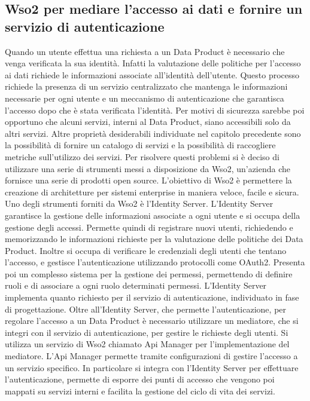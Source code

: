 \documentclass[12pt]{report}
\begin{document}
\subsection{Wso2 per mediare l'accesso ai dati e fornire un servizio di autenticazione}
Quando un utente effettua una richiesta a un  Data Product è necessario che venga verificata la sua identità.
Infatti la valutazione delle politiche per l'accesso ai dati richiede le informazioni associate all'identità dell'utente.
Questo processo richiede la presenza di un servizio centralizzato che mantenga le informazioni necessarie per ogni utente e un meccanismo di autenticazione che garantisca l'accesso dopo che è stata verificata l'identità.
Per motivi di sicurezza sarebbe poi opportuno che alcuni servizi, interni al Data Product, siano accessibili solo da altri servizi.
Altre proprietà desiderabili individuate nel capitolo precedente sono la possibilità di fornire un catalogo di servizi e la possibilità di raccogliere metriche sull'utilizzo dei servizi.
Per risolvere questi problemi si è deciso di utilizzare una serie di strumenti messi a disposizione da Wso2, un'azienda che fornisce una serie di prodotti open source. 
L'obiettivo di Wso2 è permettere la creazione di architetture per sistemi enterprise in maniera veloce, facile e sicura.
Uno degli strumenti forniti da Wso2 è l'Identity Server.
L'Identity Server garantisce la gestione delle informazioni associate a ogni utente e si occupa della gestione degli accessi.
Permette quindi di registrare nuovi utenti, richiedendo e memorizzando le informazioni richieste per la valutazione delle politiche dei Data Product. 
Inoltre si occupa di verificare le credenziali degli utenti  che tentano l'accesso, e gestisce l'autenticazione utilizzando protocolli come OAuth2.
Presenta poi un complesso sistema per la gestione dei permessi, permettendo di definire ruoli e di associare a ogni ruolo determinati permessi.
L'Identity Server implementa quanto richiesto per il servizio di autenticazione, individuato in fase di progettazione.
Oltre all'Identity Server, che permette l'autenticazione, per regolare l'accesso a un Data Product è necessario utilizzare un mediatore, che si integri con il servizio di autenticazione, per gestire le richieste degli utenti.
Si utilizza un servizio di Wso2 chiamato Api Manager per l'implementazione del mediatore.
L'Api Manager permette tramite configurazioni di gestire l'accesso a un servizio specifico.
In particolare si integra con l'Identity Server per effettuare l'autenticazione, permette di esporre dei punti di accesso che vengono poi mappati su servizi interni e facilita la gestione del ciclo di vita dei servizi.
\end{document}
